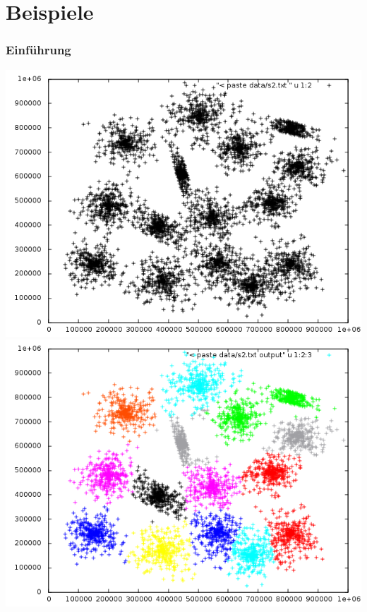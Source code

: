 \documentclass[10pt]{beamer}
\begin{document}
\section{Beispiele}
\begin{frame}
	\frametitle{Einf\"uhrung}
	\includegraphics[scale=0.34, keepaspectratio]{../output/pics/s2_black.png}
	\includegraphics[scale=0.34, keepaspectratio]{../output/pics/s2_colored.png}
\end{frame}
\end{document}
